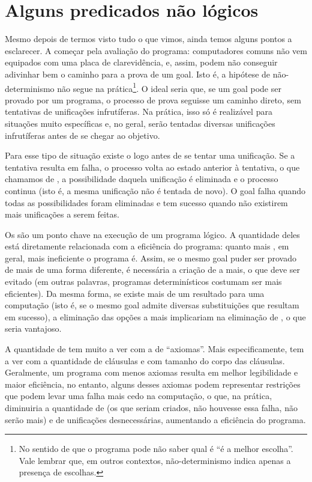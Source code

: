 \documentclass{article}
\begin{document}
\section{Alguns predicados não lógicos}

Mesmo depois de termos visto tudo o que vimos, ainda temos alguns pontos a esclarecer. A começar pela avaliação do programa: computadores comuns não vem equipados com uma placa de clarevidência, e, assim, podem não conseguir adivinhar bem o caminho para a prova de um goal. Isto é, a hipótese de não-determinismo não segue na prática\footnote{No sentido de que o programa pode não saber qual é ``é a melhor escolha''. Vale lembrar que, em outros contextos, não-determinismo indica apenas a
  presença de escolhas. }. O ideal seria que, se um goal pode ser provado por um programa, o processo de prova seguisse um caminho direto, sem tentativas de unificações infrutíferas. Na prática, isso só é realizável para situações muito específicas e, no geral, serão tentadas
diversas unificações infrutíferas antes de se chegar ao objetivo.

Para esse tipo de situação existe o  logo antes de se tentar uma unificação. Se a tentativa resulta em falha, o processo volta ao estado anterior à tentativa, o que chamamos de , a possibilidade daquela unificação é eliminada e o processo continua (isto é, a mesma unificação não é tentada de novo). O goal falha quando todas as possibilidades foram eliminadas e tem sucesso quando não existirem mais unificações a serem feitas.

Os  são um ponto chave na execução de um programa lógico. A quantidade deles está diretamente relacionada com a eficiência do programa: quanto mais , em geral, mais ineficiente o programa é. Assim, se o mesmo goal puder ser provado de mais de uma forma diferente, é necessária a criação de  a mais, o que deve ser evitado (em outras palavras, programas determinísticos costumam ser mais eficientes). Da mesma forma, se existe mais
de um resultado para uma computação (isto é, se o mesmo goal admite diversas substituições que resultam em sucesso), a eliminação das opções a mais implicariam na eliminação de , o que seria vantajoso.

A quantidade de  tem muito a ver com a de ``axiomas''. Mais especificamente, tem a ver com a quantidade de cláusulas e com tamanho do corpo das cláusulas. Geralmente, um programa com menos axiomas resulta em melhor legibilidade e maior eficiência, no entanto, alguns desses axiomas podem representar restrições que podem levar uma falha mais cedo na computação, o que, na prática, diminuiria a quantidade de  (os que seriam criados, não houvesse essa
falha, não serão mais) e de unificações
desnecessárias, aumentando a eficiência do programa.
\end{document}
